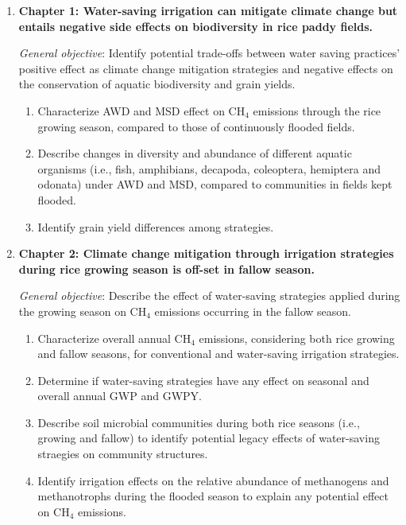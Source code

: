 { %
\renewcommand{\labelenumii}{\arabic{enumi}.\arabic{enumii}}
\renewcommand{\labelenumiii}{\arabic{enumi}.\arabic{enumii}.\arabic{enumiii}}
\renewcommand{\labelenumiv}{\arabic{enumi}.\arabic{enumii}.\arabic{enumiii}.\arabic{enumiv}}

\begin{enumerate}
\item \textbf{Chapter 1: Water-saving irrigation can mitigate climate change but entails negative side effects on biodiversity in rice paddy fields.}

\textit{General objective}: Identify potential trade-offs between water saving practices' positive effect as climate change mitigation strategies and negative effects on the conservation of aquatic biodiversity and grain yields.

\begin{enumerate}
   \item Characterize AWD and MSD effect on CH$_{4}$ emissions through the rice growing season, compared to those of continuously flooded fields.
   \item Describe changes in diversity and abundance of different aquatic organisms (i.e., fish, amphibians, decapoda, coleoptera, hemiptera and odonata) under AWD and MSD, compared to communities in fields kept flooded.
   \item Identify grain yield differences among strategies.
   
\end{enumerate}

\item \textbf{Chapter 2: Climate change mitigation through irrigation strategies during rice growing season is off-set in fallow season.}

\textit{General objective}: Describe the effect of water-saving strategies applied during the growing season on CH$_{4}$ emissions occurring in the fallow season.

\begin{enumerate}
   \item Characterize overall annual CH$_{4}$ emissions, considering both rice growing and fallow seasons, for conventional and water-saving irrigation strategies.
   \item Determine if water-saving strategies have any effect on seasonal and overall annual GWP and GWPY.
   \item Describe soil microbial communities during both rice seasons (i.e., growing and fallow) to identify potential legacy effects of water-saving straegies on community structures.
   \item Identify irrigation effects on the relative abundance of methanogens and methanotrophs during the flooded season to explain any potential effect on CH$_{4}$ emissions.
   

\end{enumerate}
\end{enumerate}}
